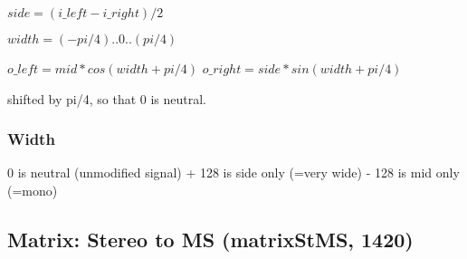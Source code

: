 \documentclass[11pt]{article}
\begin{document}
      $side = (i\_left - i\_right) / 2$

      $width = (-pi/4)..0..(pi/4)$

      $o\_left = mid * cos(width + pi/4)$
      $o\_right = side * sin(width + pi/4)$

      {\small shifted by pi/4, so that 0 is neutral.}
    \subsubsection*{Width}

         0 is neutral (unmodified signal)
	 + 128 is side only (=very wide)
	 - 128 is mid only (=mono)
       \subsection{Matrix: Stereo to MS (matrixStMS, 1420)\label{matrixStMS}\label{id1420}}
\end{document}
